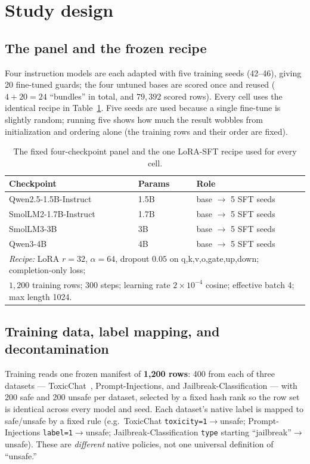 \documentclass[11pt]{article}
\newcommand{\code}[1]{\texttt{\small #1}}
\begin{document}
\section{Study design}
\label{sec:design}

\subsection{The panel and the frozen recipe}
Four instruction models are each adapted with five training seeds (42--46), giving 20
fine-tuned guards; the four untuned bases are scored once and reused ($4+20=24$ ``bundles''
in total, and $79{,}392$ scored rows). Every cell uses the identical recipe in
Table~\ref{tab:panel}. Five seeds are used because a single fine-tune is slightly random;
running five shows how much the result wobbles from initialization and ordering alone (the
training rows and their order are fixed).

\begin{table}[t]
\centering\small
\caption{The fixed four-checkpoint panel and the one LoRA-SFT recipe used for every cell.}
\label{tab:panel}
\begin{tabular}{lll}
\toprule
Checkpoint & Params & Role \\
\midrule
Qwen2.5-1.5B-Instruct & 1.5B & base $\to$ 5 SFT seeds \\
SmolLM2-1.7B-Instruct & 1.7B & base $\to$ 5 SFT seeds \\
SmolLM3-3B~\cite{bakouch2025smollm3}            & 3B   & base $\to$ 5 SFT seeds \\
Qwen3-4B             & 4B   & base $\to$ 5 SFT seeds \\
\midrule
\multicolumn{3}{l}{\emph{Recipe:} LoRA $r{=}32$, $\alpha{=}64$, dropout $0.05$ on
q,k,v,o,gate,up,down; completion-only loss;}\\
\multicolumn{3}{l}{\phantom{\emph{Recipe:}} $1{,}200$ training rows; 300 steps; learning rate
$2\times10^{-4}$ cosine; effective batch 4; max length 1024.}\\
\bottomrule
\end{tabular}
\end{table}

\subsection{Training data, label mapping, and decontamination}
Training reads one frozen manifest of \textbf{1{,}200 rows}: 400 from each of three datasets
--- ToxicChat~\cite{lin2023toxicchat}, Prompt-Injections, and Jailbreak-Classification --- with 200 safe and 200
unsafe per dataset, selected by a fixed hash rank so the row set is identical across every
model and seed. Each dataset's native label is mapped to safe/unsafe by a fixed rule (e.g.\
ToxicChat \code{toxicity=1}$\to$unsafe; Prompt-Injections \code{label=1}$\to$unsafe;
Jailbreak-Classification \code{type} starting ``jailbreak''$\to$unsafe). These are
\emph{different} native policies, not one universal definition of ``unsafe.''
\end{document}

